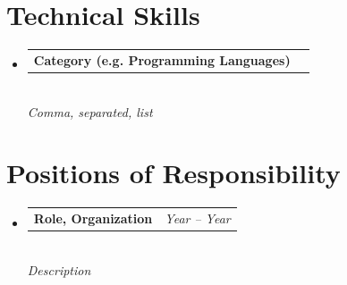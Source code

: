 \documentclass[a4paper,11pt]{article}
\makeatletter
\newcommand{\resumeProject}[3]{
\vspace{2.5mm}\item
    \begin{tabular*}{0.98\textwidth}[t]{l@{\extracolsep{\fill}}r}
        \textbf{#1} & \textit{\footnotesize{#3}} \\
    \end{tabular*}\\[-1mm]
    \footnotesize{\textit{#2}}
}
\newcommand{\resumeSubHeadingListStart}{\begin{itemize}[leftmargin=*,labelsep=0mm]}
\newcommand{\resumeSubHeadingListEnd}{\end{itemize}\vspace{2mm}}
\makeatother
\begin{document}
\section{Technical Skills}
\vspace{-2mm}
\resumeSubHeadingListStart
    \resumeProject
      {Category (e.g. Programming Languages)}
      {Comma, separated, list}
      {}
\resumeSubHeadingListEnd
\vspace{-1.5mm}

\section{Positions of Responsibility}
\vspace{-3mm}
\resumeSubHeadingListStart
    \resumeProject
      {Role, Organization}
      {Description}
      {Year -- Year}
\resumeSubHeadingListEnd
\end{document}
